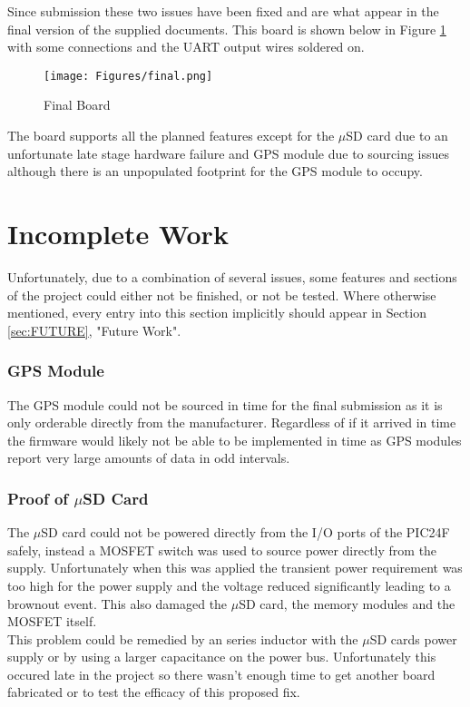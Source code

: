 \documentclass[12pt,openany,a4paper]{book}
\begin{document}
		Since submission these two issues have been fixed and are what appear in the final version of the supplied documents. This board is shown below in Figure \ref{fig:FINAL} with some connections and the UART output wires soldered on.
		
			\begin{figure}[H]
				\centering
				\texttt{[image: Figures/final.png]}
				\caption{Final Board}
				\label{fig:FINAL}
			\end{figure}			
		
		The board supports all the planned features except for the $\mu$SD card due to an unfortunate late stage hardware failure and GPS module due to sourcing issues although there is an unpopulated footprint for the GPS module to occupy.		
 
		
	\section{Incomplete Work}
	Unfortunately, due to a combination of several issues, some features and sections of the project could either not be finished, or not be tested. Where otherwise mentioned, every entry into this section implicitly  should appear in Section \ref{sec:FUTURE}, "Future Work".
	
	\subsubsection{GPS Module}
		The GPS module could not be sourced in time for the final submission as it is only orderable directly from the manufacturer. Regardless of if it arrived in time the firmware would likely not be able to be implemented in time as GPS modules report very large amounts of data in odd intervals. \\
	\subsubsection{Proof of $\mu$SD Card} \label{sec:SDERROR}
		The $\mu$SD card could not be powered directly from the I/O ports of the PIC24F safely, instead a MOSFET switch was used to source power directly from the supply. Unfortunately when this was applied the transient power requirement was too high for the power supply and the voltage reduced significantly leading to a brownout event. This also damaged the $\mu$SD card, the memory modules and the MOSFET itself. \\
		
		This problem could be remedied by an series inductor with the $\mu$SD cards power supply or by using a larger capacitance on the power bus. Unfortunately this occured late in the project so there wasn't enough time to get another board fabricated or to test the efficacy of this proposed fix. \\
		
\end{document}
